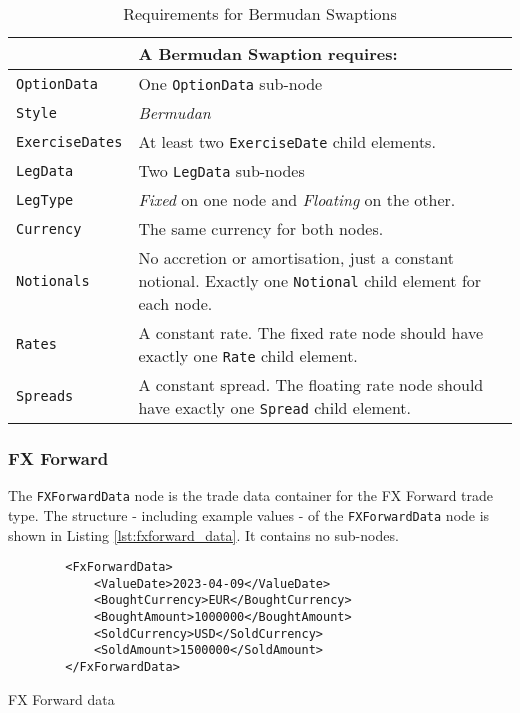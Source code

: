 \begin{table}[H]
\centering
\begin{tabu} to 0.9\linewidth {| X[-1.5,l,m] | X[-5,l,m] |}
    \hline
        & \bfseries{A Bermudan Swaption requires:} \\  \hline
    \lstinline!OptionData! & One \lstinline!OptionData! sub-node  \\  \hline
   \lstinline!Style! &  \emph{Bermudan}\\ \hline
    \lstinline!ExerciseDates! & At least two \lstinline!ExerciseDate! child elements.\\ \hline
    \lstinline!LegData! &  Two \lstinline!LegData! sub-nodes \\ \hline
    \lstinline!LegType! & \emph{Fixed} on one node and \emph{Floating} on the other.\\ \hline    
    \lstinline!Currency! & The same currency for both nodes.\\ \hline 
    \lstinline!Notionals! & No accretion or amortisation, just a constant notional. Exactly one \lstinline!Notional! child element for each node.\\ \hline
    \lstinline!Rates! & A constant rate. The fixed rate node should have exactly one \lstinline!Rate! child element.\\ \hline
    \lstinline!Spreads! &  A constant spread. The floating rate node should have exactly one \lstinline!Spread! child element.\\ \hline
  \end{tabu}
  \caption{Requirements for Bermudan Swaptions}
  \label{tab:bermudan_requirements}
\end{table}

\subsubsection{FX Forward}

The \lstinline!FXForwardData!  node is the trade data container for the FX Forward trade type.  The structure -
including example values - of the \lstinline!FXForwardData!  node is shown in Listing \ref{lst:fxforward_data}. It
contains no sub-nodes.

\begin{listing}[H]
\begin{verbatim}
        <FxForwardData>
            <ValueDate>2023-04-09</ValueDate>
            <BoughtCurrency>EUR</BoughtCurrency>
            <BoughtAmount>1000000</BoughtAmount>
            <SoldCurrency>USD</SoldCurrency>
            <SoldAmount>1500000</SoldAmount>
        </FxForwardData>
\end{verbatim}
\caption{FX Forward data}
\label{lst:fxforward_data}
\end{listing}

